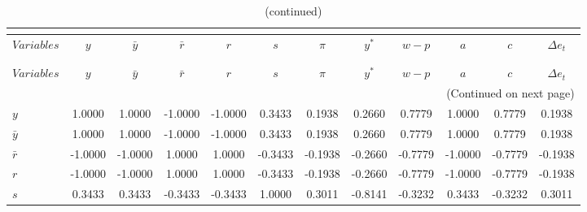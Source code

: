  
\begin{center}
\begin{longtable}{lccccccccccc} 
\caption{MATRIX OF CORRELATIONS}\\
 \label{Table:th_corr_matrix}\\
\toprule 
$Variables   $	 & 	 $             y$	 & 	 $     {\bar y}$	 & 	 $     {\bar r}$	 & 	 $             r$	 & 	 $             s$	 & 	 $        {\pi}$	 & 	 $         {y^*}$	 & 	 $         {w-p}$	 & 	 $             a$	 & 	 $             c$	 & 	 $   \Delta e_t$\\
\midrule \endfirsthead 
\caption{(continued)}\\
 \toprule \\ 
$Variables   $	 & 	 $             y$	 & 	 $     {\bar y}$	 & 	 $     {\bar r}$	 & 	 $             r$	 & 	 $             s$	 & 	 $        {\pi}$	 & 	 $         {y^*}$	 & 	 $         {w-p}$	 & 	 $             a$	 & 	 $             c$	 & 	 $   \Delta e_t$\\
\midrule \endhead 
\midrule \multicolumn{12}{r}{(Continued on next page)} \\ \bottomrule \endfoot 
\bottomrule \endlastfoot 
$y           $	 & 	        1.0000	 & 	        1.0000	 & 	       -1.0000	 & 	       -1.0000	 & 	        0.3433	 & 	        0.1938	 & 	        0.2660	 & 	        0.7779	 & 	        1.0000	 & 	        0.7779	 & 	        0.1938 \\ 
${\bar y}    $	 & 	        1.0000	 & 	        1.0000	 & 	       -1.0000	 & 	       -1.0000	 & 	        0.3433	 & 	        0.1938	 & 	        0.2660	 & 	        0.7779	 & 	        1.0000	 & 	        0.7779	 & 	        0.1938 \\ 
${\bar r}    $	 & 	       -1.0000	 & 	       -1.0000	 & 	        1.0000	 & 	        1.0000	 & 	       -0.3433	 & 	       -0.1938	 & 	       -0.2660	 & 	       -0.7779	 & 	       -1.0000	 & 	       -0.7779	 & 	       -0.1938 \\ 
$r           $	 & 	       -1.0000	 & 	       -1.0000	 & 	        1.0000	 & 	        1.0000	 & 	       -0.3433	 & 	       -0.1938	 & 	       -0.2660	 & 	       -0.7779	 & 	       -1.0000	 & 	       -0.7779	 & 	       -0.1938 \\ 
$s           $	 & 	        0.3433	 & 	        0.3433	 & 	       -0.3433	 & 	       -0.3433	 & 	        1.0000	 & 	        0.3011	 & 	       -0.8141	 & 	       -0.3232	 & 	        0.3433	 & 	       -0.3232	 & 	        0.3011 \\ 

\end{longtable}
\end{center}
